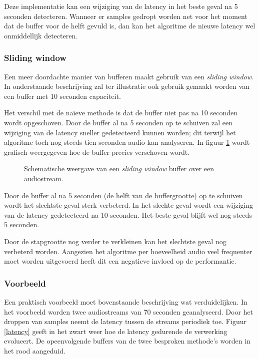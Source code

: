 Deze implementatie kan een wijziging van de latency in het beste geval na 5 seconden detecteren. Wanneer er samples gedropt worden net voor het moment dat de buffer voor de helft gevuld is, dan kan het algoritme de nieuwe latency wel onmiddellijk detecteren.

\subsubsection{Sliding window}

Een meer doordachte manier van bufferen maakt gebruik van een \textit{sliding window}. In onderstaande beschrijving zal ter illustratie ook gebruik gemaakt worden van een buffer met 10 seconden capaciteit. 

Het verschil met de naïeve methode is dat de buffer niet pas na 10 seconden wordt opgeschoven. Door de buffer al na 5 seconden op te schuiven zal een wijziging van de latency sneller gedetecteerd kunnen worden; dit terwijl het algoritme toch nog steeds tien seconden audio kan analyseren. In figuur \ref{slidingwindow} wordt grafisch weergegeven hoe de buffer precies verschoven wordt.

\begin{figure}[h!]
	\captionsetup{width=0.7\textwidth}
	\caption[Schematische weergave van de buffer]{Schematische weergave van een \textit{sliding window} buffer over een audiostream.}
	\begin{center}
		\advance\parskip0.3cm
		
	\end{center}
	\label{slidingwindow}
\end{figure}

Door de buffer al na 5 seconden (de helft van de buffergrootte) op te schuiven wordt het slechtste geval sterk verbeterd. In het slechte geval wordt een wijziging van de latency gedetecteerd na 10 seconden. Het beste geval blijft wel nog steeds 5 seconden.

Door de stapgrootte nog verder te verkleinen kan het slechtste geval nog verbeterd worden. Aangezien het algoritme per hoeveelheid audio veel frequenter moet worden uitgevoerd heeft dit een negatieve invloed op de performantie.

\subsubsection{Voorbeeld}

Een praktisch voorbeeld moet bovenstaande beschrijving wat verduidelijken. In het voorbeeld worden twee audiostreams van 70 seconden geanalyseerd. Door het droppen van samples neemt de latency tussen de streams periodiek toe. Figuur \ref{latency} geeft in het zwart weer hoe de latency gedurende de verwerking evolueert. De opeenvolgende buffers van de twee besproken methode's worden in het rood aangeduid. 

